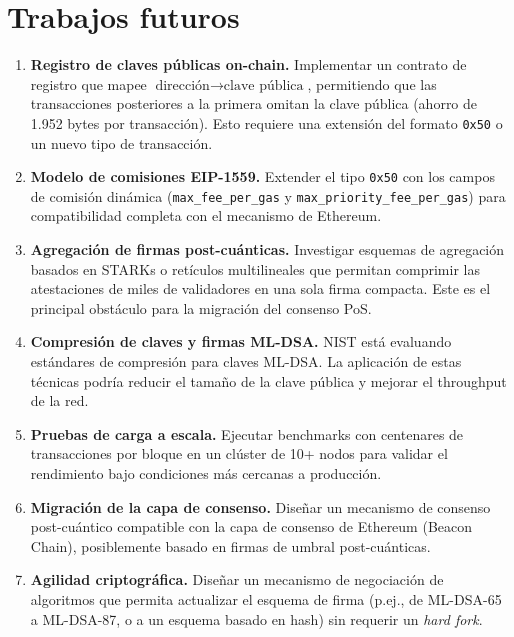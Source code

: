 \section{Trabajos futuros}
\label{sec:futuro}

\begin{enumerate}
  \item \textbf{Registro de claves públicas on-chain.} Implementar un contrato de registro que mapee $\text{dirección} \to \text{clave pública}$, permitiendo que las transacciones posteriores a la primera omitan la clave pública (ahorro de 1.952 bytes por transacción). Esto requiere una extensión del formato \texttt{0x50} o un nuevo tipo de transacción.
  
  \item \textbf{Modelo de comisiones EIP-1559.} Extender el tipo \texttt{0x50} con los campos de comisión dinámica (\texttt{max\_fee\_per\_gas} y \texttt{max\_priority\_fee\_per\_gas}) para compatibilidad completa con el mecanismo de Ethereum.
  
  \item \textbf{Agregación de firmas post-cuánticas.} Investigar esquemas de agregación basados en STARKs o retículos multilineales que permitan comprimir las atestaciones de miles de validadores en una sola firma compacta. Este es el principal obstáculo para la migración del consenso PoS.
  
  \item \textbf{Compresión de claves y firmas ML-DSA.} NIST está evaluando estándares de compresión para claves ML-DSA. La aplicación de estas técnicas podría reducir el tamaño de la clave pública y mejorar el throughput de la red.
  
  \item \textbf{Pruebas de carga a escala.} Ejecutar benchmarks con centenares de transacciones por bloque en un clúster de 10+ nodos para validar el rendimiento bajo condiciones más cercanas a producción.
  
  \item \textbf{Migración de la capa de consenso.} Diseñar un mecanismo de consenso post-cuántico compatible con la capa de consenso de Ethereum (Beacon Chain), posiblemente basado en firmas de umbral post-cuánticas.
  
  \item \textbf{Agilidad criptográfica.} Diseñar un mecanismo de negociación de algoritmos que permita actualizar el esquema de firma (p.ej., de ML-DSA-65 a ML-DSA-87, o a un esquema basado en hash) sin requerir un \emph{hard fork}.
  

\end{enumerate}
